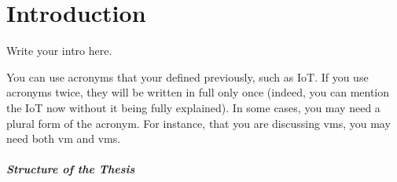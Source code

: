 
\chapter{Introduction}
\label{chap:introduction}

Write your intro here.

You can use acronyms that your defined previously,
such as \ac{IoT}.
%
If you use acronyms twice,
they will be written in full only once
(indeed, you can mention the \ac{IoT} now without it being fully explained).
%
In some cases, you may need a plural form of the acronym.
%
For instance,
that you are discussing \acp{vm},
you may need both \ac{vm} and \acp{vm}.

\paragraph{Structure of the Thesis}



